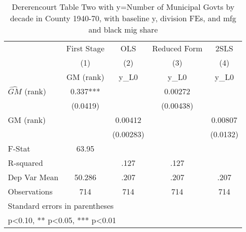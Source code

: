 \begin{table}[htbp]\centering
\def\sym#1{\ifmmode^{#1}\else\(^{#1}\)\fi}
\caption{Dererencourt Table Two with y=Number of Municipal Govts by decade in County 1940-70, with baseline y, division FEs, and mfg and black mig share}
\begin{tabular}{l*{4}{c}}
\toprule
                    & First Stage   &         OLS   &Reduced Form   &        2SLS   \\
                    &\multicolumn{1}{c}{(1)}&\multicolumn{1}{c}{(2)}&\multicolumn{1}{c}{(3)}&\multicolumn{1}{c}{(4)}\\
                    &\multicolumn{1}{c}{GM  (rank)}&\multicolumn{1}{c}{y\_L0}&\multicolumn{1}{c}{y\_L0}&\multicolumn{1}{c}{y\_L0}\\
\midrule
$\hat{GM}$ (rank)   &       0.337***&               &     0.00272   &               \\
                    &    (0.0419)   &               &   (0.00438)   &               \\
\addlinespace
GM  (rank)          &               &     0.00412   &               &     0.00807   \\
                    &               &   (0.00283)   &               &    (0.0132)   \\
\midrule
F-Stat              &       63.95   &               &               &               \\
R-squared           &               &        .127   &        .127   &               \\
Dep Var Mean        &      50.286   &        .207   &        .207   &        .207   \\
Observations        &         714   &         714   &         714   &         714   \\
\bottomrule
\multicolumn{5}{l}{\footnotesize Standard errors in parentheses}\\
\multicolumn{5}{l}{\footnotesize * p<0.10, ** p<0.05, *** p<0.01}\\
\end{tabular}
\end{table}
